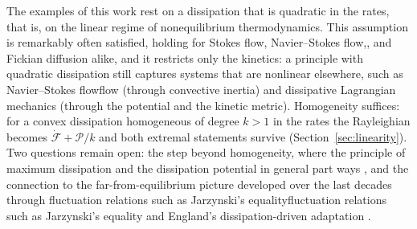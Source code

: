 \documentclass[12pt]{article}
\newif\ifhighlight \highlightfalse
\newif\ifhighlightfirst \highlightfirstfalse
\DeclareRobustCommand{\chg}[1]{\ifhighlight\ifhighlightfirst\textcolor{revised}{#1}\else#1\fi\else#1\fi}
\begin{document}
The examples of this work rest on a dissipation that is quadratic in the rates, that is, on the linear regime of nonequilibrium thermodynamics. This assumption is remarkably often satisfied, holding for Stokes flow, Navier--Stokes flow\chg{,} and Fickian diffusion \cite{flachberger2024} alike, and it restricts only the kinetics: a principle with quadratic dissipation still captures systems that are nonlinear elsewhere, such as Navier--Stokes \chg{flow} (through convective inertia) and dissipative Lagrangian mechanics (through the potential and the kinetic metric). Homogeneity suffices: for a convex dissipation homogeneous of degree $k > 1$ in the rates the Rayleighian becomes $\dot{\mathcal{F}} + \mathcal{P}/k$ and both extremal statements survive (Section~\ref{sec:linearity}). Two questions remain open: the step beyond homogeneity, where the principle of maximum dissipation and the dissipation potential in general part ways \cite{hackl2008}, and the connection to the far-from-equilibrium picture developed over the last decades through \chg{fluctuation relations such as Jarzynski's equality} \cite{jarzynski1997} and England's dissipation-driven adaptation \cite{england2013}.
\end{document}

